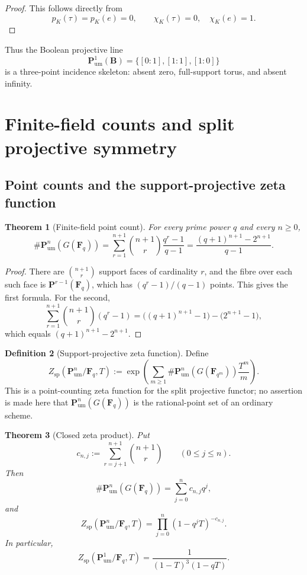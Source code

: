\documentclass[11pt]{amsart}
\numberwithin{equation}{section}
\newtheorem{theorem}{Theorem}[section]
\theoremstyle{definition}
\newtheorem{definition}[theorem]{Definition}
\newcommand{\B}{\mathbf B}
\newcommand{\F}{\mathbf F}
\newcommand{\Pum}{\mathbf P_{\mathrm{um}}}
\begin{document}
\begin{proof}
This follows directly from
\[
p_K(\tau)=p_K(e)=0,
\qquad
\chi_K(\tau)=0,
\quad
\chi_K(e)=1.
\]
\end{proof}

Thus the Boolean projective line
\[
\Pum^1(\B)=\{[0:1],[1:1],[1:0]\}
\]
is a three-point incidence skeleton: absent zero, full-support torus, and absent infinity.

\section{Finite-field counts and split projective symmetry}

\subsection{Point counts and the support-projective zeta function}

\begin{theorem}[Finite-field point count]\label{thm:finite-field-point-count}
For every prime power $q$ and every $n\ge0$,
\[
\#\Pum^n(G(\F_q))
=
\sum_{r=1}^{n+1}
\binom{n+1}{r}\frac{q^r-1}{q-1}
=
\frac{(q+1)^{n+1}-2^{n+1}}{q-1}.
\]
\end{theorem}

\begin{proof}
There are $\binom{n+1}{r}$ support faces of cardinality $r$, and the fibre over each such face is $\mathbf P^{r-1}(\F_q)$, which has $(q^r-1)/(q-1)$ points.  This gives the first formula.  For the second,
\[
\sum_{r=1}^{n+1}\binom{n+1}{r}(q^r-1)
=
\bigl((q+1)^{n+1}-1\bigr)-\bigl(2^{n+1}-1\bigr),
\]
which equals $(q+1)^{n+1}-2^{n+1}$.
\end{proof}

\begin{definition}[Support-projective zeta function]\label{def:support-zeta}
Define
\[
Z_{\mathrm{sp}}(\Pum^n/\F_q,T)
:=
\exp\left(
\sum_{m\ge1}
\#\Pum^n(G(\F_{q^m}))\frac{T^m}{m}
\right).
\]
This is a point-counting zeta function for the split projective functor; no assertion is made here that $\Pum^n(G(\F_q))$ is the rational-point set of an ordinary scheme.
\end{definition}

\begin{theorem}[Closed zeta product]\label{thm:support-zeta-product}
Put
\[
c_{n,j}:=\sum_{r=j+1}^{n+1}\binom{n+1}{r}
\qquad(0\le j\le n).
\]
Then
\[
\#\Pum^n(G(\F_q))
=
\sum_{j=0}^{n}c_{n,j}q^j,
\]
and
\[
\boxed{
Z_{\mathrm{sp}}(\Pum^n/\F_q,T)
=
\prod_{j=0}^{n}(1-q^jT)^{-c_{n,j}}.}
\]
In particular,
\[
Z_{\mathrm{sp}}(\Pum^1/\F_q,T)
=
\frac{1}{(1-T)^3(1-qT)}.
\]
\end{theorem}
\end{document}
